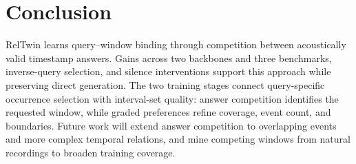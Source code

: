 \section{Conclusion}
RelTwin learns query--window binding through competition between acoustically valid timestamp answers. Gains across two backbones and three benchmarks, inverse-query selection, and silence interventions support this approach while preserving direct generation. The two training stages connect query-specific occurrence selection with interval-set quality: answer competition identifies the requested window, while graded preferences refine coverage, event count, and boundaries. Future work will extend answer competition to overlapping events and more complex temporal relations, and mine competing windows from natural recordings to broaden training coverage.
